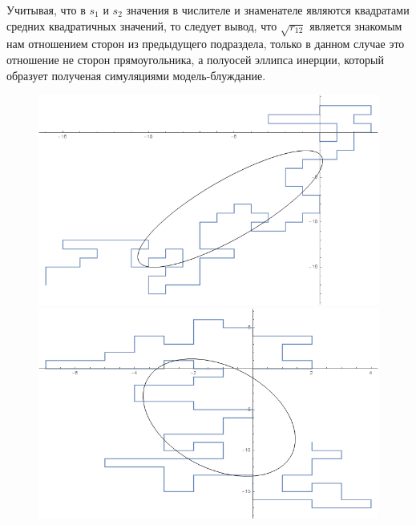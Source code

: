 Учитывая, что в $s_{1}$ и $s_{2}$ значения в числителе и знаменателе являются квадратами средних квадратичных значений, то следует вывод, что $\sqrt{r_{12}}$ является знакомым нам отношением сторон из предыдущего подраздела, только в данном случае это отношение не сторон прямоугольника, а полуосей эллипса инерции, который образует полученая симуляциями модель-блуждание.

\begin{figure}
\begin{minipage}[h]{0.5\linewidth}
     \includegraphics[width=\linewidth]{Sections/Images/GyrationEllipse.png}
\end{minipage}
\hfill
\begin{minipage}[h]{0.5\linewidth}
    \includegraphics[width=\linewidth]{Sections/Images/GyrationEllipse2.png}
\end{minipage}
\vfill
\begin{minipage}[h]{0.5\linewidth}

\end{minipage}
\end{figure}
